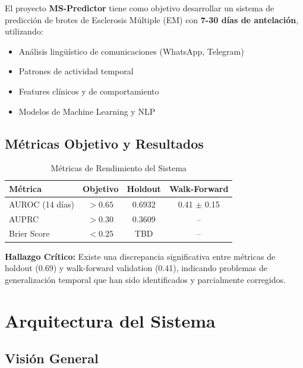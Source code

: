 \documentclass[11pt,a4paper]{article}
\begin{document}
El proyecto \textbf{MS-Predictor} tiene como objetivo desarrollar un sistema de predicción de brotes de Esclerosis Múltiple (EM) con \textbf{7-30 días de antelación}, utilizando:

\begin{itemize}
    \item Análisis lingüístico de comunicaciones (WhatsApp, Telegram)
    \item Patrones de actividad temporal
    \item Features clínicos y de comportamiento
    \item Modelos de Machine Learning y NLP
\end{itemize}

\subsection{Métricas Objetivo y Resultados}

\begin{table}[H]
\centering
\caption{Métricas de Rendimiento del Sistema}
\begin{tabular}{lccc}
\toprule
\textbf{Métrica} & \textbf{Objetivo} & \textbf{Holdout} & \textbf{Walk-Forward} \\
\midrule
AUROC (14 días) & $> 0.65$ & \textcolor{successgreen}{0.6932} & \textcolor{warnred}{0.41 $\pm$ 0.15} \\
AUPRC & $> 0.30$ & 0.3609 & -- \\
Brier Score & $< 0.25$ & TBD & -- \\
\bottomrule
\end{tabular}
\end{table}

\textbf{Hallazgo Crítico:} Existe una discrepancia significativa entre métricas de holdout (0.69) y walk-forward validation (0.41), indicando problemas de generalización temporal que han sido identificados y parcialmente corregidos.

\section{Arquitectura del Sistema}

\subsection{Visión General}
\end{document}
